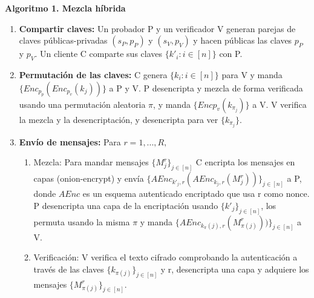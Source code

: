 \textbf{Algoritmo 1. Mezcla híbrida}
\begin{enumerate}
	\item \textbf{Compartir claves:} Un probador P y un verificador V generan parejas de claves públicas-privadas $(s_P,p_P)$ y $(s_V,p_V)$ y hacen públicas las claves $p_P$ y $p_V$. Un cliente C comparte sus claves $\{k'_i: i \in [n]\}$ con P.
	\item \textbf{Permutación de las claves:} C genera $\{k_i: i \in [n]\}$ para V y manda $\{Enc_{p_p}(Enc_{p_v}(k_j))\}$ a P y V. P desencripta y mezcla de
	forma verificada usando una permutación aleatoria $\pi$, y manda
	$\{Enc{p_v}(k_{\pi_j})\}$ a V. V verifica la mezcla y la desencriptación, y desencripta para ver $\{k_{\pi _j}\}$.
	\item  \textbf{Envío de mensajes:} Para $r=1,...,R,$
	\begin{enumerate}
		\item Mezcla: Para mandar mensajes $\{M_j^r\}_{j \in [n]}$ C encripta los mensajes en capas (onion-encrypt) y envía
		 $\{AEnc_{k'_j,r}(A Enc_{k_j ,r}(M_j ^r))\}_{j \in [n]}$ a P, donde $AEnc$ es un esquema autenticado encriptado que usa r como nonce. P desencripta una capa de la encriptación usando $\{k'_j\}_{j \in [n]}$, los permuta usando la misma $\pi$ y manda $\{AEnc_{k_\pi(j),r}(M_{\pi(j)} ^r))\}_{j \in [n]}$ a V.
		 \item Verificación: V verifica el texto cifrado comprobando la autenticación a través de las claves $\{k_{\pi(j)}\}_{j \in [n]}$ y r, desencripta una capa y adquiere los mensajes $\{M_{\pi(j)}^r\}_{j \in [n]}$.
	\end{enumerate}
	

\end{enumerate}
